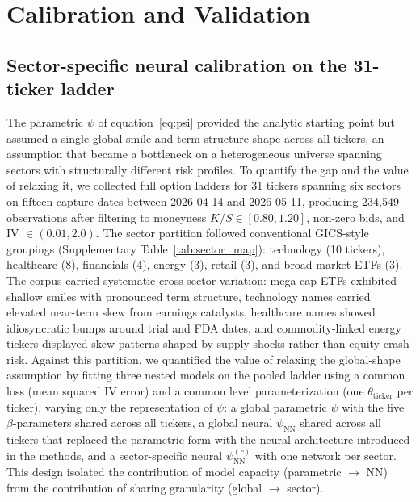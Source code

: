 \section{Calibration and Validation}\label{sec:calibration}

\subsection{Sector-specific neural calibration on the 31-ticker ladder}\label{sec:ladder}

The parametric $\psi$ of equation~\eqref{eq:psi} provided the analytic starting point but assumed a single global smile and term-structure shape across all tickers, an assumption that became a bottleneck on a heterogeneous universe spanning sectors with structurally different risk profiles. To quantify the gap and the value of relaxing it, we collected full option ladders for 31 tickers spanning six sectors on fifteen capture dates between 2026-04-14 and 2026-05-11, producing 234{,}549 observations after filtering to moneyness $K/S \in [0.80, 1.20]$, non-zero bids, and IV $\in (0.01, 2.0)$. The sector partition followed conventional GICS-style groupings (Supplementary Table~\ref{tab:sector_map}): technology (10 tickers), healthcare (8), financials (4), energy (3), retail (3), and broad-market ETFs (3). The corpus carried systematic cross-sector variation: mega-cap ETFs exhibited shallow smiles with pronounced term structure, technology names carried elevated near-term skew from earnings catalysts, healthcare names showed idiosyncratic bumps around trial and FDA dates, and commodity-linked energy tickers displayed skew patterns shaped by supply shocks rather than equity crash risk. Against this partition, we quantified the value of relaxing the global-shape assumption by fitting three nested models on the pooled ladder using a common loss (mean squared IV error) and a common level parameterization (one $\theta_{\text{ticker}}$ per ticker), varying only the representation of $\psi$: a global parametric $\psi$ with the five $\beta$-parameters shared across all tickers, a global neural $\psi_{\text{NN}}$ shared across all tickers that replaced the parametric form with the neural architecture introduced in the methods, and a sector-specific neural $\psi_{\text{NN}}^{(c)}$ with one network per sector. This design isolated the contribution of model capacity (parametric $\to$ NN) from the contribution of sharing granularity (global $\to$ sector).

